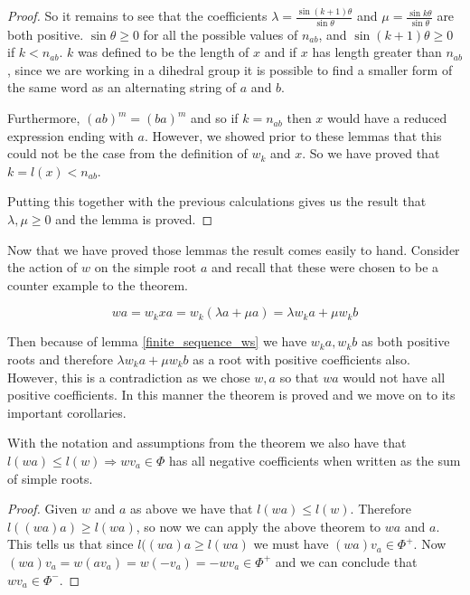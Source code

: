 \documentclass[a4paper,12pt]{article}
\begin{document}
\begin{proof}
	So it remains to see that the coefficients $\lambda = \frac{\sin{(k+1)\theta}}{\sin{\theta}}$ and $\mu = \frac{\sin{k\theta}}{\sin{\theta}}$ are both positive. $\sin{\theta} \geq 0$ for all the possible values of $n_{ab}$, and $\sin{(k+1)\theta} \geq 0$ if $k < n_{ab}$. $k$ was defined to be the length of $x$ and if $x$ has length greater than $n_{ab}$, since we are working in a dihedral group it is possible to find a smaller form of the same word as an alternating string of $a$ and $b$. 
	
	Furthermore, $(ab)^m = (ba)^m$ and so if $k = n_{ab}$ then $x$ would have a reduced expression ending with $a$. However, we showed prior to these lemmas that this could not be the case from the definition of $w_k$ and $x$. So we have proved that $k = l(x) < n_{ab}$.
	
	Putting this together with the previous calculations gives us the result that $\lambda, \mu \geq 0$ and the lemma is proved.
\end{proof}

Now that we have proved those lemmas the result comes easily to hand. Consider the action of $w$ on the simple root $a$ and recall that these were chosen to be a counter example to the theorem.

\[wa = w_kxa = w_k(\lambda a + \mu a) = \lambda w_k a + \mu w_k b\]

Then because of lemma \ref{finite_sequence_ws} we have $w_ka, w_kb$ as both positive roots and therefore $\lambda w_k a + \mu w_k b$ as a root with positive coefficients also. However, this is a contradiction as we chose $w, a$ so that $wa$ would not have all positive coefficients. In this manner the theorem is proved and we move on to its important corollaries.

\begin{cor}
	With the notation and assumptions from the theorem we also have that $l(wa) \leq l(w) \Rightarrow wv_a \in \Phi$ has all negative coefficients when written as the sum of simple roots.
\end{cor}

\begin{proof}
	Given $w$ and $a$ as above we have that $l(wa) \leq l(w)$. Therefore $l((wa)a) \geq l(wa)$, so now we can apply the above theorem to $wa$ and $a$. This tells us that since $l((wa)a \geq l(wa)$ we must have $(wa)v_a \in \Phi^+$. Now $(wa)v_a = w(av_a) = w(-v_a) = -wv_a \in \Phi^+$ and we can conclude that $wv_a \in \Phi^-$.
\end{proof}
\end{document}
